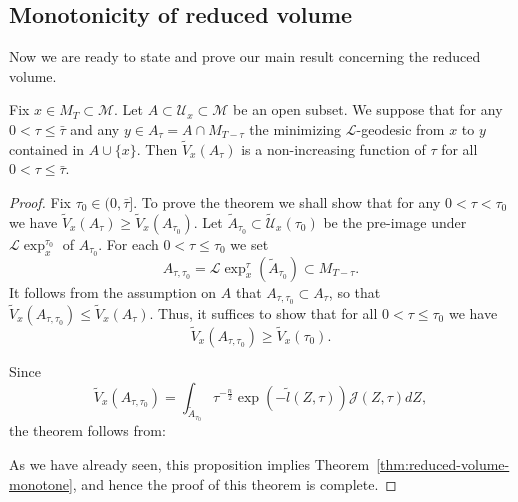 \subsection{Monotonicity of reduced volume}

Now we are ready to state and prove our main result concerning the
reduced volume.




\begin{theorem}\label{thm:reduced-volume-monotone}
\label{Amono}

Fix $x\in M_T\subset {\mathcal M}$. Let $A\subset{\mathcal
U}_x\subset {\mathcal M}$ be an open  subset. We suppose that for
any $0<\tau\le \bar\tau$ and any $y\in A_\tau=A\cap M_{T-\tau}$ the
minimizing ${\mathcal L}$-geodesic from $x$ to $y$ contained in
$A\cup \{x\}$.  Then $\widetilde V_x(A_\tau)$ is a non-increasing
function of $\tau$ for all $0<\tau\le \bar\tau$.
\end{theorem}





\begin{proof}

\sketch
Fix $\tau_0\in (0,\bar\tau]$. To prove the theorem we shall show
that for any $0<\tau<\tau_0$ we have $\widetilde V_x(A_\tau)\ge
\widetilde V_x(A_{\tau_0})$. Let $\widetilde A_{\tau_0}\subset
\widetilde {\mathcal U}_x(\tau_0)$ be the pre-image under ${\mathcal
L}\exp_x^{\tau_0}$ of $A_{\tau_0}$. For each $0<\tau\le \tau_0$
we set
$$A_{\tau,\tau_0}={\mathcal L}\exp_x^\tau(\widetilde
A_{\tau_0})\subset M_{T-\tau}.$$ It follows from the assumption on
$A$ that $A_{\tau,\tau_0}\subset A_\tau$, so that $\widetilde
V_x(A_{\tau,\tau_0})\le \widetilde V_x(A_\tau)$. Thus, it suffices
to show that for all $0<\tau\le \tau_0$ we have
$$\widetilde V_x(A_{\tau,\tau_0})\ge \widetilde V_x(\tau_0).$$

Since
$$ \widetilde V_x(A_{\tau,\tau_0})=\int_{\widetilde A_{\tau_0}} \tau^{-\frac{n}{2}}
\exp(-\tilde l(Z,\tau)){\mathcal J}(Z,\tau)dZ,$$ the theorem
follows from:





As we have already seen, this proposition implies
 Theorem~\ref{thm:reduced-volume-monotone}, and hence the proof of this theorem is complete.
\end{proof}

